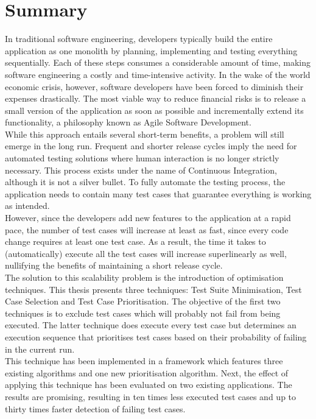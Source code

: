 
\chapter{Summary}
In traditional software engineering, developers typically build the entire application as one monolith by planning, implementing and testing everything sequentially. Each of these steps consumes a considerable amount of time, making software engineering a costly and time-intensive activity. In the wake of the world economic crisis, however, software developers have been forced to diminish their expenses drastically. The most viable way to reduce financial risks is to release a small version of the application as soon as possible and incrementally extend its functionality, a philosophy known as Agile Software Development.\\

\noindent While this approach entails several short-term benefits, a problem will still emerge in the long run. Frequent and shorter release cycles imply the need for automated testing solutions where human interaction is no longer strictly necessary. This process exists under the name of Continuous Integration, although it is not a silver bullet. To fully automate the testing process, the application needs to contain many test cases that guarantee everything is working as intended. \\

\noindent However, since the developers add new features to the application at a rapid pace, the number of test cases will increase at least as fast, since every code change requires at least one test case. As a result, the time it takes to (automatically) execute all the test cases will increase superlinearly as well, nullifying the benefits of maintaining a short release cycle.\\

\noindent The solution to this scalability problem is the introduction of optimisation techniques. This thesis presents three techniques: Test Suite Minimisation, Test Case Selection and Test Case Prioritisation. The objective of the first two techniques is to exclude test cases which will probably not fail from being executed. The latter technique does execute every test case but determines an execution sequence that prioritises test cases based on their probability of failing in the current run.\\

\noindent This technique has been implemented in a framework which features three existing algorithms and one new prioritisation algorithm. Next, the effect of applying this technique has been evaluated on two existing applications. The results are promising, resulting in ten times less executed test cases and up to thirty times faster detection of failing test cases.\\